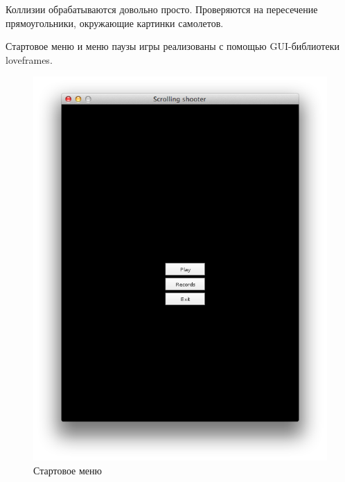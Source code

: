 \documentclass[12pt]{article}
\begin{document}
Коллизии обрабатываются довольно просто. Проверяются на пересечение прямоугольники,
окружающие картинки самолетов.

Стартовое меню и меню паузы игры реализованы с помощью GUI-библиотеки loveframes.~\cite{love}

\begin{figure}[!htb]
  \centering
    \includegraphics[scale=0.5]{pics/start.png}
   \caption{Стартовое меню}
    \label{fig:start}
\end{figure}
\end{document}
